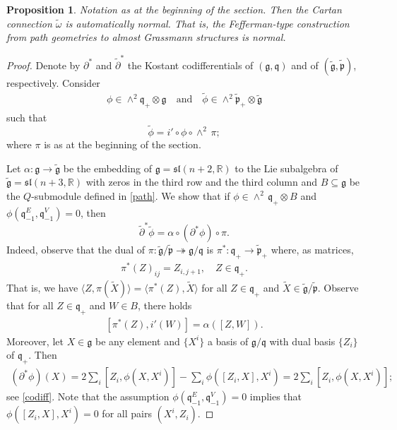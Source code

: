 \documentclass[11pt]{amsart}
\newtheorem{proposition}{Proposition}
\begin{document}
\begin{proposition}\label{path Fef is normal}
Notation as at the beginning of the section. Then the Cartan connection $\tilde\omega$ is automatically normal. That is, the Fefferman-type construction from path geometries to almost Grassmann structures is normal.
\end{proposition}
\begin{proof}
Denote by $\partial^*$ and $\tilde\partial^*$ the Kostant codifferentials of $(\mathfrak g,\mathfrak q)$ and of $(\tilde{\mathfrak g},\tilde{\mathfrak p})$, respectively. Consider
\begin{align*}
    \phi\in\wedge^2\mathfrak q_+\otimes\mathfrak g
    \quad\text{and}\quad
    \tilde\phi\in\wedge^2\tilde{\mathfrak p}_+\otimes\tilde{\mathfrak g}
\end{align*}
such that
\[\tilde\phi=i'\circ\phi\circ\wedge^2\,\pi;\]
where $\pi$ is as at the beginning of the section.

Let $\alpha:\mathfrak g\to\tilde{\mathfrak g}$ be the embedding of $\mathfrak g=\mathfrak{sl}(n+2,\mathbb R)$ to the Lie subalgebra of $\tilde{\mathfrak g}=\mathfrak{sl}(n+3,\mathbb R)$ with zeros in the third row and the third column and $B\subseteq\mathfrak g$ be the $Q$-submodule defined in \cref{path}. We show that if $\phi\in\wedge^2\,\mathfrak q_+\otimes B$ and $\phi(\mathfrak q_{-1}^E,\mathfrak q_{-1}^V)=0$, then \[\tilde\partial^*\tilde\phi=\alpha\circ(\partial^*\phi)\circ\pi.\] Indeed, observe that the dual of $\pi:\tilde{\mathfrak g}/\tilde{\mathfrak p}\twoheadrightarrow\mathfrak g/\mathfrak q$ is $\pi^*:\mathfrak q_+\to\tilde{\mathfrak p}_+$ where, as matrices,
\begin{align}\label{dual pi}
\pi^*(Z)_{ij}=Z_{i,j+1},\quad Z\in\mathfrak q_+.
\end{align}
That is, we have $\langle Z,\pi( \tilde X)\rangle=\langle \pi^*( Z),\tilde X\rangle$ for all $Z\in\mathfrak q_+$ and $\tilde X\in\tilde{\mathfrak g}/\tilde{\mathfrak p}$. Observe that for all $Z\in \mathfrak q_+$ and $W\in B$, there holds
\begin{align}\label{pi and alpha}
[\pi^*(Z),i'(W)]=\alpha([Z,W]).
\end{align}
Moreover, let $X\in\mathfrak g$ be any element and $\{X^i\}$ a basis of $\mathfrak g/\mathfrak q$ with dual basis $\{Z_i\}$ of $\mathfrak q_+$. Then
\begin{align*}
    (\partial^*\phi)(X)=2\sum_i[Z_i,\phi(X,X^i)]-\sum_i\phi([Z_i,X],X^i)=2\sum_i[Z_i,\phi(X,X^i)];
\end{align*}
see \eqref{codiff}. Note that the assumption $\phi(\mathfrak q_{-1}^E,\mathfrak q_{-1}^V)=0$ implies that $\phi([Z_i,X],X^i)=0$ for all pairs $(X^i,Z_i)$.


\end{proof}
\end{document}
